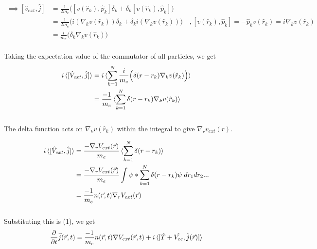 \documentclass[12pt]{article}
\begin{document}
\begin{align*}
    \implies [\hat{v}_{ext},\hat{j}] &= \frac{1}{2 m_e} \Big( [v(\hat{r}_k), \hat{p}_k ]\delta_k +  
    \delta_k [v(\hat{r}_k), \hat{p}_k ] \Big) \\
    &= \frac{1}{2 m_e} \Big( i (\nabla_k v(\hat{r}_k)) \delta_k + \delta_k i (\nabla_k v(\hat{r}_k)) 
    \Big) \quad ,[v(\hat{r}_k), \hat{p}_k ] =  - \hat{p}_k v(\hat{r}_k) = i \nabla_k v(\hat{r}_k) \\ 
    &= \frac{i}{m_e} \Big( \delta_k \nabla_k v(\hat{r}_k) \Big)
\end{align*} 
\\
Taking the expectation value of the commutator of all particles, we get
\begin{align*}
    i \braket{[\hat{V}_{ext},\hat{j}]} &= i \braket{ \sum_{k=1}^N \frac{i}{m_e} \Big( \delta(r -r_k) \nabla_k v(\hat{r}_k) \Big)} \\
    &= \frac{-1}{m_e} \braket{\sum_{k=1}^N \delta(r -r_k) \nabla_k v(\hat{r}_k)}
\end{align*}
\\
The delta function acts on $\nabla_k v(\hat{r}_k)$ within the integral to give $\nabla_r v_{ext}(r)$. 

\begin{align*}
    i \braket{[\hat{V}_{ext},\hat{j}]} &= \frac{- \nabla_r V_{ext}(\vec{r})}{m_e} \braket{\sum_{k=1}^N \delta(r-r_k)} \\
    &= \frac{- \nabla_r V_{ext}(\vec{r})}{m_e} \int \psi* \sum_{k=1}^N \delta(r-r_k) \psi \; dr_1 dr_2 ... \\
    &= \frac{-1}{m_e} n(\vec{r},t) \nabla_r V_{ext}(\vec{r})  
\end{align*}
\\
Substituting this is (1), we get 
\[ \frac{\partial}{\partial t}\vec{j}(\vec{r},t) = \frac{-1}{m_e} n(\vec{r},t) \nabla  V_{ext}(\vec{r},t) + 
i \braket{[\hat{T} + \hat{V_{ee}},\hat{j}(\vec{r})]} \]
\end{document}

